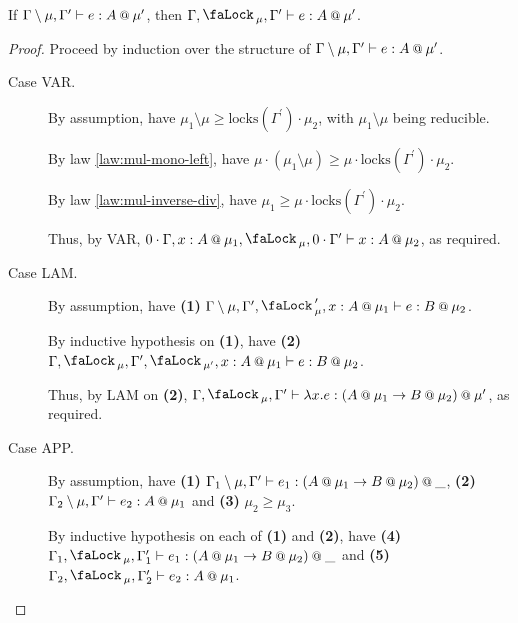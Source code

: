 \documentclass[acmsmall,screen,nonacm]{acmart}
\makeatletter
\newcommand{\at}{\mathbin{\mbox{\small\ensuremath{@}}}}
\newcommand{\tee}{\vdash}
\DeclareMathOperator{\lock}{\tikz{\node[scale=1, line width=0pt, inner sep=0pt] at (0,0) {\faLock\,};}}
\makeatother
\begin{document}
\begin{theorem}
\label{thm:mode-qualifiers-div-to-lock}
  If $\Gamma \setminus \mu, \Gamma^\prime \tee e : A \at \mu^\prime$, then $\Gamma, \lock_\mu, \Gamma^\prime \tee e : A \at \mu^\prime$.
\end{theorem}

\begin{proof}
  Proceed by induction over the structure of $\Gamma \setminus \mu, \Gamma^\prime \tee e : A \at \mu^\prime$.
  \begin{description}
    \item[Case VAR.]
    By assumption, have $\mu_1 \setminus \mu \ge \mathrm{locks}(\Gamma^\prime) \cdot \mu_2$, with $\mu_1 \setminus \mu$ being reducible. 
    
    By law \ref{law:mul-mono-left}, have $\mu \cdot (\mu_1 \setminus \mu) \ge \mu \cdot \mathrm{locks}(\Gamma^\prime) \cdot \mu_2$. 
    
    By law \ref{law:mul-inverse-div}, have $\mu_1 \ge \mu \cdot \mathrm{locks}(\Gamma^\prime) \cdot \mu_2$. 
    
    Thus, by VAR, $0 \cdot \Gamma, x : A \at \mu_1, \lock_\mu, 0 \cdot \Gamma^\prime \tee x : A \at \mu_2$, as required.
    \\
    \item[Case LAM.]
    By assumption, have \textbf{(1)} $\Gamma \setminus \mu, \Gamma^\prime, \lock_\mu^\prime, x : A \at \mu_1 \tee e : B \at \mu_2$. 
    
    By inductive hypothesis on \textbf{(1)}, have \textbf{(2)} $\Gamma, \lock_\mu, \Gamma^\prime, \lock_{\mu^\prime}, x : A \at \mu_1 \tee e : B \at \mu_2$.
    
    Thus, by LAM on \textbf{(2)}, $\Gamma, \lock_\mu, \Gamma^\prime \tee \lambda x.e : (A \at \mu_1 \rightarrow B \at \mu_2) \at \mu^\prime$, as required.
    \\
    \item[Case APP.]
    By assumption, have \textbf{(1)} $\Gamma_1 \setminus \mu, \Gamma^\prime \tee e_1 : (A \at \mu_1 \rightarrow B \at \mu_2) \at \_$, \textbf{(2)} $\Gamma_2 \setminus \mu, \Gamma^\prime \tee e_2 : A \at \mu_1$ and \textbf{(3)} $\mu_2 \ge \mu_3$. 
    
    By inductive hypothesis on each of \textbf{(1)} and \textbf{(2)}, have \textbf{(4)} $\Gamma_1, \lock_\mu, \Gamma^\prime_1 \tee e_1 : (A \at \mu_1 \rightarrow B \at \mu_2) \at \_$ and \textbf{(5)} $\Gamma_2, \lock_\mu, \Gamma^\prime_2 \tee e_2 : A \at \mu_1$.
    

\end{description}
\end{proof}
\end{document}
